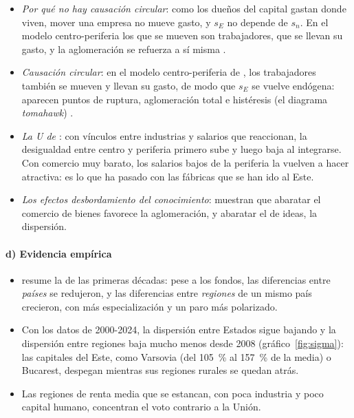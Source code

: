 \documentclass[11pt]{article}
\begin{document}
\begin{itemize}
\item \emph{Por qué no hay causación circular}: como los dueños del capital gastan donde viven, mover una empresa no mueve gasto, y $s_E$ no depende de $s_n$. En el modelo centro-periferia los que se mueven son trabajadores, que se llevan su gasto, y la aglomeración se refuerza a sí misma .
\item \emph{Causación circular}: en el modelo centro-periferia de \textcite{Krugman1991Increasing}, los trabajadores también se mueven y llevan su gasto, de modo que $s_E$ se vuelve endógena: aparecen puntos de ruptura, aglomeración total e histéresis (el diagrama \emph{tomahawk}) .
\item \emph{La U de \textcite{KrugmanVenables1995Globalization}}: con vínculos entre industrias y salarios que reaccionan, la desigualdad entre centro y periferia primero sube y luego baja al integrarse. Con comercio muy barato, los salarios bajos de la periferia la vuelven a hacer atractiva: es lo que ha pasado con las fábricas que se han ido al Este.
\item \emph{Los efectos desbordamiento del conocimiento}: \textcite{BaldwinForslid2000Core} muestran que abaratar el comercio de bienes favorece la aglomeración, y abaratar el de ideas, la dispersión.
\end{itemize}

\paragraph{d) Evidencia empírica}

\begin{itemize}
\item \textcite{Puga2002} resume la de las primeras décadas: pese a los fondos, las diferencias entre \emph{países} se redujeron, y las diferencias entre \emph{regiones} de un mismo país crecieron, con más especialización y un paro más polarizado.
\item Con los datos de 2000-2024, la dispersión entre Estados sigue bajando y la dispersión entre regiones baja mucho menos desde 2008 (gráfico~\ref{fig:sigma}): las capitales del Este, como Varsovia (del 105~\% al 157~\% de la media) o Bucarest, despegan mientras sus regiones rurales se quedan atrás\nocite{Eurostat2026Regional}.
\item Las regiones de renta media que se estancan, con poca industria y poco capital humano, concentran el voto contrario a la Unión\nocite{IammarinoEtAl2019,RodriguezPose2018}.
\end{itemize}
\end{document}

